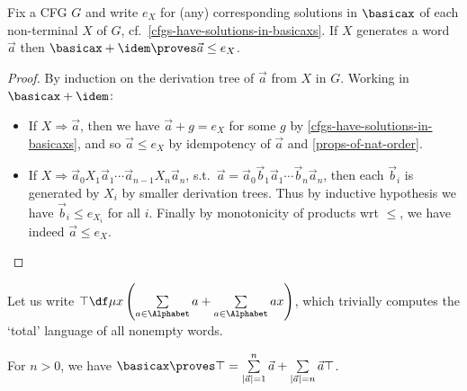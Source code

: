 \documentclass[runningheads]{amsart}
\begin{document}
\begin{lemma}
\label{lem:membership}
    Fix a CFG $G $ and write $ e_X$ for (any) corresponding solutions in $\basicax$ of each non-terminal $X$ of $G$, cf.~\cref{cfgs-have-solutions-in-basicaxs}. 
    If $X$ generates a word $\vec a$ then $\basicax + \idem \proves \vec a \leq e_X$.
\end{lemma}
\begin{proof}
    By induction on the derivation tree of $\vec a $ from $X$ in $G$.
    Working in $\basicax+\idem$:
    \begin{itemize}
        \item If $X \Rightarrow \vec a$, then we have $\vec a + g = e_X$ for some $g$ by \cref{cfgs-have-solutions-in-basicaxs}, and so $\vec a \leq e_X$ by idempotency of $\vec a$ and \cref{props-of-nat-order}.
        \item If $X \Rightarrow \vec a_0 X_1 \vec a_1 \cdots \vec a_{n-1}  X_n \vec a_n$, s.t.\ $\vec a = \vec a_0 \vec b_1 \vec a_1 \cdots \vec b_n \vec a_n$, then each $\vec b_i $ is generated by $X_i$ by smaller derivation trees.
        Thus by inductive hypothesis we have $\vec b_i \leq e_{X_i}$ for all $i$.
        Finally by monotonicity of products wrt $\leq$, we have indeed $\vec a \leq e_X$.\qedhere
    \end{itemize}
\end{proof}

Let us write $\top \df \mu x \left(\sum\limits_{a \in \Alphabet} a + \sum\limits_{a\in \Alphabet} ax \right)$, which trivially computes the `total' language of all nonempty words.

\begin{lemma}
\label{lem:unfolding-top}
    For $n>0$, we have $\basicax \proves \top = \sum\limits_{|\vec a|=1}^{n}\vec a + \sum\limits_{|\vec a|= n} \vec a \top$.
\end{lemma}
\end{document}
